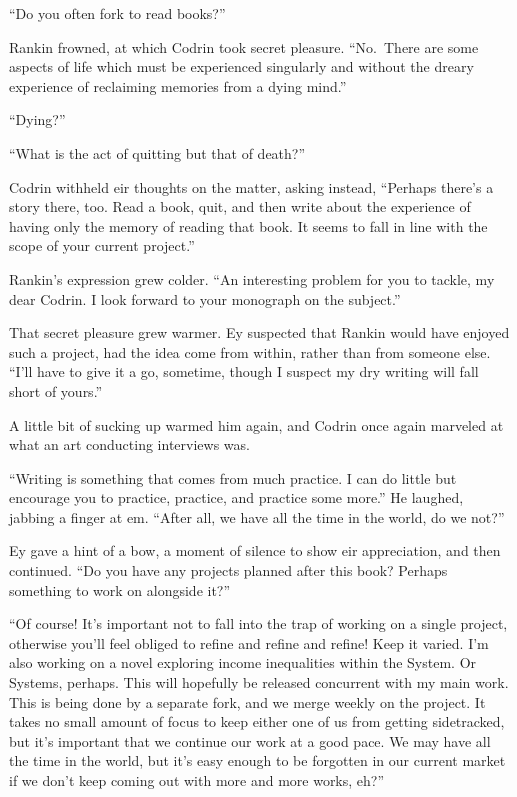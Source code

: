 ``Do you often fork to read books?''

Rankin frowned, at which Codrin took secret pleasure. ``No.~There are some aspects of life which must be experienced singularly and without the dreary experience of reclaiming memories from a dying mind.''

``Dying?''

``What is the act of quitting but that of death?''

Codrin withheld eir thoughts on the matter, asking instead, ``Perhaps there's a story there, too. Read a book, quit, and then write about the experience of having only the memory of reading that book. It seems to fall in line with the scope of your current project.''

Rankin's expression grew colder. ``An interesting problem for you to tackle, my dear Codrin. I look forward to your monograph on the subject.''

That secret pleasure grew warmer. Ey suspected that Rankin would have enjoyed such a project, had the idea come from within, rather than from someone else. ``I'll have to give it a go, sometime, though I suspect my dry writing will fall short of yours.''

A little bit of sucking up warmed him again, and Codrin once again marveled at what an art conducting interviews was.

``Writing is something that comes from much practice. I can do little but encourage you to practice, practice, and practice some more.'' He laughed, jabbing a finger at em. ``After all, we have all the time in the world, do we not?''

Ey gave a hint of a bow, a moment of silence to show eir appreciation, and then continued. ``Do you have any projects planned after this book? Perhaps something to work on alongside it?''

``Of course! It's important not to fall into the trap of working on a single project, otherwise you'll feel obliged to refine and refine and refine! Keep it varied. I'm also working on a novel exploring income inequalities within the System. Or Systems, perhaps. This will hopefully be released concurrent with my main work. This is being done by a separate fork, and we merge weekly on the project. It takes no small amount of focus to keep either one of us from getting sidetracked, but it's important that we continue our work at a good pace. We may have all the time in the world, but it's easy enough to be forgotten in our current market if we don't keep coming out with more and more works, eh?''


